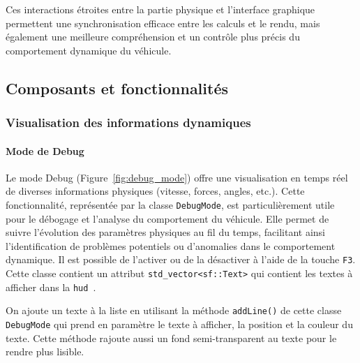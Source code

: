 Ces interactions étroites entre la partie physique et l'interface graphique permettent une synchronisation efficace entre les calculs et le rendu, mais également une meilleure compréhension et un contrôle plus précis du comportement dynamique du véhicule.


\subsection{Composants et fonctionnalités}\label{subsec:composants-et-fonctionnalites}

\subsubsection{Visualisation des informations dynamiques}\label{subsubsec:visualisation-des-informations-dynamiques}

\paragraph{Mode de Debug}
Le mode Debug (Figure~\ref{fig:debug_mode}) offre une visualisation en temps réel de diverses informations physiques (vitesse, forces, angles, etc.).
Cette fonctionnalité, représentée par la classe \texttt{DebugMode}, est particulièrement utile pour le débogage et l'analyse du comportement du véhicule.
Elle permet de suivre l'évolution des paramètres physiques au fil du temps, facilitant ainsi l'identification de problèmes potentiels ou d'anomalies dans le comportement dynamique.
Il est possible de l'activer ou de la désactiver à l'aide de la touche \texttt{F3}.
Cette classe contient un attribut \texttt{\gls{std_vector}<sf::Text>}\cite{cpp_reference_vector} qui contient les textes à afficher dans la \texttt{\gls{hud} }.

On ajoute un texte à la liste en utilisant la méthode \texttt{addLine()} de cette classe \texttt{DebugMode} qui prend en paramètre le texte à afficher, la position et la couleur du texte.
Cette méthode rajoute aussi un fond semi-transparent au texte pour le rendre plus lisible.

